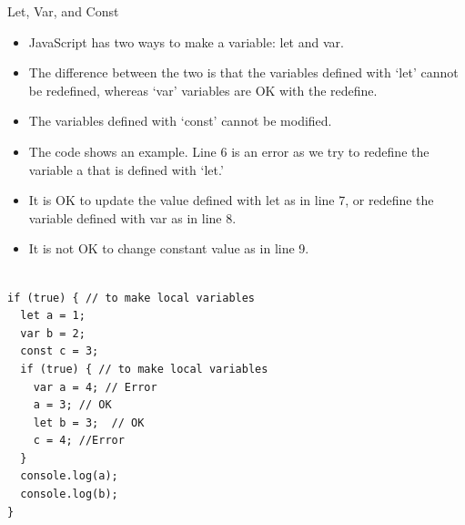 


\begin{frame}[fragile]{Let, Var, and Const}

\begin{itemize}
	\item JavaScript has two ways to make a variable: let and var. 
	\item The difference between the two is that the variables defined with `let' cannot be redefined, whereas `var' variables are OK with the redefine. 
    \item The variables defined with `const' cannot be modified. 
\end{itemize}

\end{frame}

\begin{frame}[fragile]{}

\begin{itemize}
	\item The code shows an example. Line 6 is an error as we try to redefine the variable a that is defined with `let.' 
	\item It is OK to update the value defined with let as in line 7, or redefine the variable defined with var as in line 8. 
	\item It is not OK to change constant value as in line 9. 
\end{itemize}

\begin{Code}{}%
\begin{lstlisting}[firstnumber=1, label=glabels, xleftmargin=0pt, basicstyle=\tiny]% 

if (true) { // to make local variables
  let a = 1; 
  var b = 2;
  const c = 3;
  if (true) { // to make local variables
    var a = 4; // Error
    a = 3; // OK 
    let b = 3;  // OK
    c = 4; //Error 
  }
  console.log(a); 
  console.log(b);
}
\end{lstlisting}%
\end{Code}

\end{frame}

